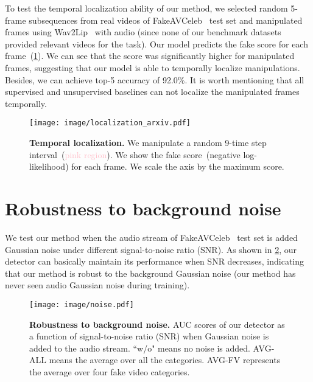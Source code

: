 \documentclass[10pt,twocolumn,letterpaper]{article}
\def\upvspacefig{\vspace{-0.0mm}}
\begin{document}
To test the temporal localization ability of our method, we selected random 5-frame subsequences from real videos of FakeAVCeleb~\cite{NEURIPS_DATASETS_AND_BENCHMARKS2021_d9d4f495} test set and manipulated frames using Wav2Lip~\cite{prajwal2020lip} with audio (since none of our benchmark datasets provided relevant videos for the task). Our model predicts the fake score for each frame~(\cref{temporal_localization_arxiv}). We can see that the score was significantly higher for manipulated frames, suggesting that our model is able to temporally localize manipulations. Besides, we can achieve top-5 accuracy of 92.0\%. It is worth mentioning that all supervised and unsupervised baselines can not localize the manipulated frames temporally. 
\begin{figure}[h]
    \centering

    \texttt{[image: image/localization\_arxiv.pdf]}

        \caption{\textbf{Temporal localization.} We manipulate a random 9-time step interval~(\textcolor{pink}{pink region}). We show the fake score~(negative log-likelihood) for each frame. We scale the  axis by the maximum score. } 

        
    \label{temporal_localization_arxiv}
\end{figure} 
\section{Robustness to background noise}

We test our method when the audio stream of FakeAVCeleb~\cite{NEURIPS_DATASETS_AND_BENCHMARKS2021_d9d4f495} test set is added Gaussian noise under different signal-to-noise ratio (SNR). As shown in \cref{noise}, our detector can basically maintain its performance when SNR decreases, indicating that our method is robust to the background Gaussian noise (our method has never seen audio Gaussian noise during training). 
\begin{figure}[h]
    \centering
    \upvspacefig
    \texttt{[image: image/noise.pdf]}
    \caption{\textbf{Robustness to background noise.} AUC scores  of our detector as a function of signal-to-noise ratio (SNR) when Gaussian noise is added to the audio stream. ``w/o" means no noise is added. AVG-ALL means the average over all the categories. AVG-FV represents the average over four fake video categories.} 
    \label{noise}
\end{figure}  
\end{document}
